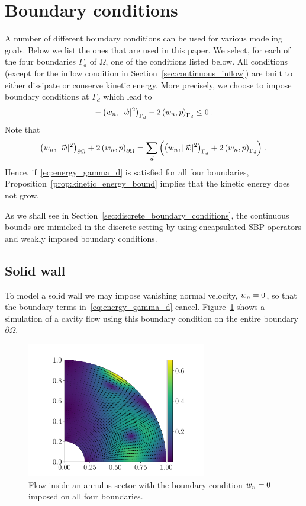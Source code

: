 \section{Boundary conditions}%
\label{sec:boundary_conditions}
A number of different boundary conditions can be used for various modeling goals. Below we list the ones that are used in this paper. We select, for each of the four boundaries $\Gamma_d$ of $\Omega$, one of the conditions listed below. All conditions (except for the inflow condition in Section~\ref{sec:continuous_inflow}) are built to either dissipate or conserve kinetic energy. More precisely, we choose to impose boundary conditions at $\Gamma_d$ which lead to
\begin{equation}
  \label{eq:energy_gamma_d}
  -\ipbcpart{\wcn}{|\wc|^2} - 2\ipbcpart{\wcn}{p} \leq 0 \,.
\end{equation}
Note that
\begin{equation*}
  \ipbc{\wcn}{|\wc|^2} + 2\ipbc{\wcn}{p} = \sum_d \left(\ipbcpart{\wcn}{|\wc|^2} + 2\ipbcpart{\wcn}{p} \right) \,.
\end{equation*}
Hence, if~\eqref{eq:energy_gamma_d} is satisfied for all four boundaries, Proposition~\ref{prop:kinetic_energy_bound} implies that the kinetic energy does not grow.

As we shall see in Section~\ref{sec:discrete_boundary_conditions}, the continuous bounds are mimicked in the discrete setting by using encapsulated SBP operators and weakly imposed boundary conditions.

\subsection{Solid wall}
To model a solid wall we may impose vanishing normal velocity, $w_n = 0$, so that the boundary terms in~\eqref{eq:energy_gamma_d} cancel. Figure~\ref{fig:cavity_flow} shows a simulation of a cavity flow using this boundary condition on the entire boundary $\partial \Omega$.
\begin{figure}%
  \centering
  \includegraphics[width=0.7\textwidth]{images/cavity_flow.pdf}
  \caption{Flow inside an annulus sector with the boundary condition $w_n = 0$ imposed on all four boundaries.}%
  \label{fig:cavity_flow}
\end{figure}

